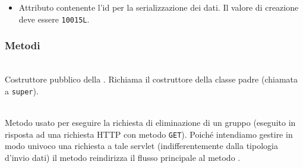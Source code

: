 \begin{itemize}
	\item{}
	Attributo contenente l'id per la serializzazione dei dati. Il valore di creazione deve essere \texttt{10015L}.
\end{itemize}

\subsubsection*{Metodi}

\begin{description}
	\item{}\\
	Costruttore pubblico della . Richiama il costruttore della classe padre (chiamata a \texttt{super}).
	
	\item{}\\
	Metodo usato per eseguire la richiesta di eliminazione di un gruppo (eseguito in risposta ad una richiesta HTTP con metodo \texttt{GET}). Poiché intendiamo gestire in modo univoco una richiesta a tale servlet (indifferentemente dalla tipologia d'invio dati) il metodo reindirizza il flusso principale al metodo .
	

\end{description}
